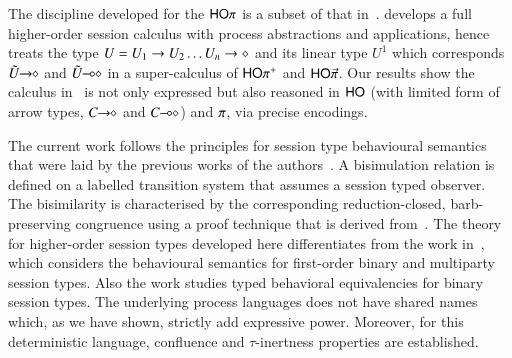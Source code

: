 The discipline developed for the $\mathsf{HO}\pi$ is a subset
of that in~\cite{tlca07,MostrousY15}.
\cite{tlca07} develops a full higher-order session calculus
with process abstractions and applications, hence  
treats the type 
$U=U_1 \rightarrow U_2 \dots U_n \rightarrow \diamond$ and its linear type 
$U^1$
which corresponds $\tilde{U}\!\! \rightarrow\!\! \diamond$ and $\tilde{U}\!\! \multimap\!\! \diamond$ in 
a super-calculus of $\mathsf{HO\pi^{+}}$ and $\mathsf{HO}{\vec{\pi}}$. 
Our results show
the calculus in~\cite{tlca07} is not only expressed but 
also reasoned in 
$\mathsf{HO}$ (with limited form of arrow types, $C\!\! \rightarrow\!\! \diamond$ and $C\!\! \multimap\!\! \diamond$) and 
$\pi$, via precise encodings. 

The current work follows the principles for
session type behavioural semantics that were laid
by the previous works of the
authors~\cite{KYHH2015,KY2015}.
A bisimulation relation is defined on a labelled
transition system that assumes a session typed
observer.
The bisimilarity is characterised by the corresponding
reduction-closed, barb-preserving congruence using a
proof technique that is derived from~\cite{Hennessy07}.
The theory for higher-order session types developed here
differentiates from 
the work in~\cite{KYHH2015,KY2015}, which 
considers the behavioural semantics for first-order
binary and multiparty session types.
Also the work \cite{DBLP:journals/iandc/PerezCPT14} studies typed behavioral equivalencies for binary session types.
The underlying process languages does not have shared names which, as we have shown, strictly add expressive power. 
Moreover, for this deterministic language, confluence and $\tau$-inertness properties are established.

